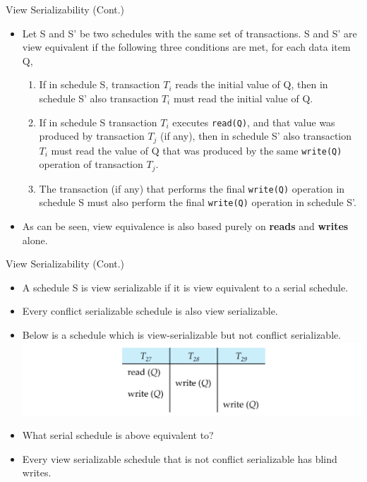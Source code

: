 \documentclass{beamer}
\begin{document}
\begin{frame}{View Serializability (Cont.)}

    \begin{itemize}
        \item Let S and S' be two schedules with the same set of transactions. S and S' are view equivalent if the following three conditions are met, for each data item Q,
            \begin{enumerate} \pause
                \item If in schedule S, transaction $T_i$ reads the initial value of Q, then in schedule S' also transaction $T_i$ must read the initial value of Q. \pause
                \item If in schedule S transaction $T_i$ executes \texttt{read(Q)}, and that value was produced by transaction $T_j$ (if any), then in schedule S' also transaction $T_i$ must read the value of Q that was produced by the same \texttt{write(Q)} operation of transaction $T_j$. \pause
                \item The transaction (if any) that performs the final \texttt{write(Q)} operation in schedule S must also perform the final \texttt{write(Q)} operation in schedule S'. \pause
            \end{enumerate}
        \item As can be seen, view equivalence is also based purely on \textbf{reads} and \textbf{writes} alone.
    \end{itemize}

\end{frame}

\begin{frame}{View Serializability (Cont.)}
    \begin{itemize}
        \item A schedule S is view serializable if it is view equivalent to a serial schedule.
        \item Every conflict serializable schedule is also view serializable.
        \item Below is a schedule which is view-serializable but not conflict serializable.
            \includegraphics[width=.9\textwidth]{figures/view_ser1}
        \item What serial schedule is above equivalent to?
        \item Every view serializable schedule that is not conflict serializable has blind writes.
    \end{itemize}
\end{frame}
\end{document}
